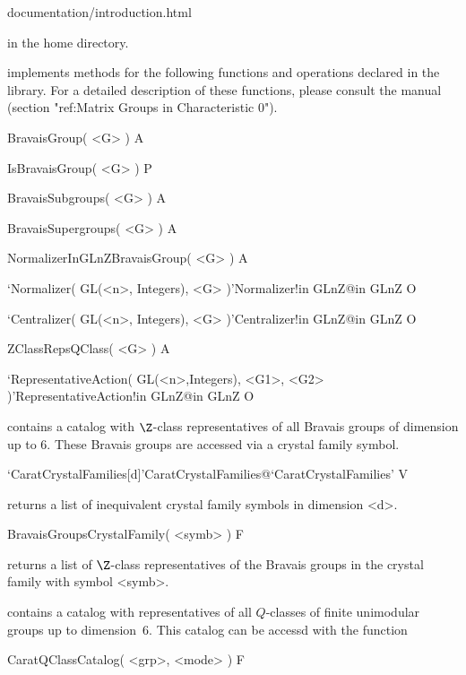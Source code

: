\begintt
documentation/introduction.html
\endtt

in the {\CARAT} home directory.



{\CARAT} implements methods for the following functions and operations
declared in the {\GAP} library. For a detailed description of these
functions, please consult the {\GAP} manual (section 
"ref:Matrix Groups in Characteristic 0").

\>BravaisGroup( <G> ) A

\>IsBravaisGroup( <G> ) P

\>BravaisSubgroups( <G> ) A

\>BravaisSupergroups( <G> ) A

\>NormalizerInGLnZBravaisGroup( <G> ) A

\>`Normalizer( GL(<n>, Integers), <G> )'{Normalizer!in GLnZ}@{in GLnZ} O

\>`Centralizer( GL(<n>, Integers), <G> )'{Centralizer!in GLnZ}@{in GLnZ} O

\>ZClassRepsQClass( <G> ) A

\>`RepresentativeAction( GL(<n>,Integers), <G1>, <G2> )'{RepresentativeAction!in GLnZ}@{in GLnZ} O



{\CARAT} contains a catalog with $\Z$-class representatives of all
Bravais groups of dimension up to 6. These Bravais groups are
accessed via a crystal family symbol.

\>`CaratCrystalFamilies[d]'{CaratCrystalFamilies}@{`CaratCrystalFamilies'} V

returns a list of inequivalent crystal family symbols in dimension <d>.

\>BravaisGroupsCrystalFamily( <symb> ) F

returns a list of $\Z$-class representatives of the Bravais groups
in the crystal family with symbol <symb>.


{\CARAT} contains a catalog with representatives of all $Q$-classes of
finite unimodular groups up to dimension~6. This catalog can be accessd
with the function

\>CaratQClassCatalog( <grp>, <mode> ) F

